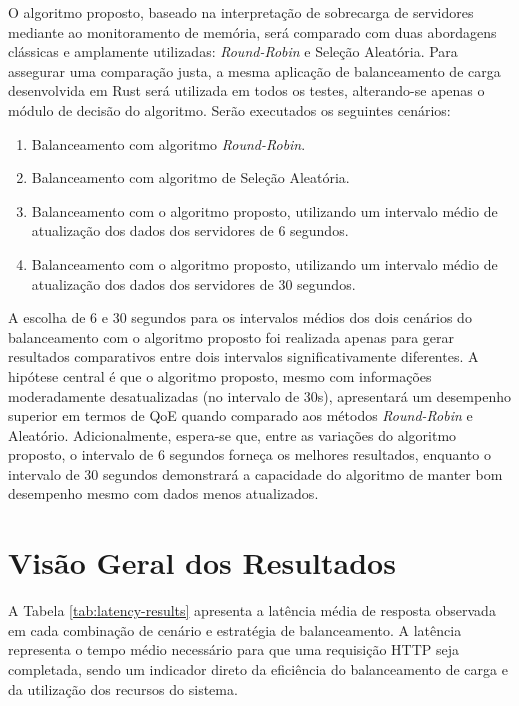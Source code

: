 O algoritmo proposto, baseado na interpretação de sobrecarga de servidores mediante ao monitoramento de memória, será comparado com duas abordagens clássicas e amplamente utilizadas: \textit{Round-Robin} e Seleção Aleatória. Para assegurar uma comparação justa, a mesma aplicação de balanceamento de carga desenvolvida em Rust será utilizada em todos os testes, alterando-se apenas o módulo de decisão do algoritmo. Serão executados os seguintes cenários:

\begin{enumerate}
    \item{Balanceamento com algoritmo \textit{Round-Robin}.}
    \item{Balanceamento com algoritmo de Seleção Aleatória.}
    \item{Balanceamento com o algoritmo proposto, utilizando um intervalo médio de atualização dos dados dos servidores de 6 segundos.}
    \item{Balanceamento com o algoritmo proposto, utilizando um intervalo médio de atualização dos dados dos servidores de 30 segundos.}
\end{enumerate}

A escolha de 6 e 30 segundos para os intervalos médios dos dois cenários do balanceamento com o algoritmo proposto foi realizada apenas para gerar resultados comparativos entre dois intervalos significativamente diferentes. A hipótese central é que o algoritmo proposto, mesmo com informações moderadamente desatualizadas (no intervalo de 30s), apresentará um desempenho superior em termos de QoE quando comparado aos métodos \textit{Round-Robin} e Aleatório. Adicionalmente, espera-se que, entre as variações do algoritmo proposto, o intervalo de 6 segundos forneça os melhores resultados, enquanto o intervalo de 30 segundos demonstrará a capacidade do algoritmo de manter bom desempenho mesmo com dados menos atualizados.

\section{Visão Geral dos Resultados}

A Tabela \ref{tab:latency-results} apresenta a latência média de resposta observada em cada combinação de cenário e estratégia de balanceamento. A latência representa o tempo médio necessário para que uma requisição HTTP seja completada, sendo um indicador direto da eficiência do balanceamento de carga e da utilização dos recursos do sistema.


